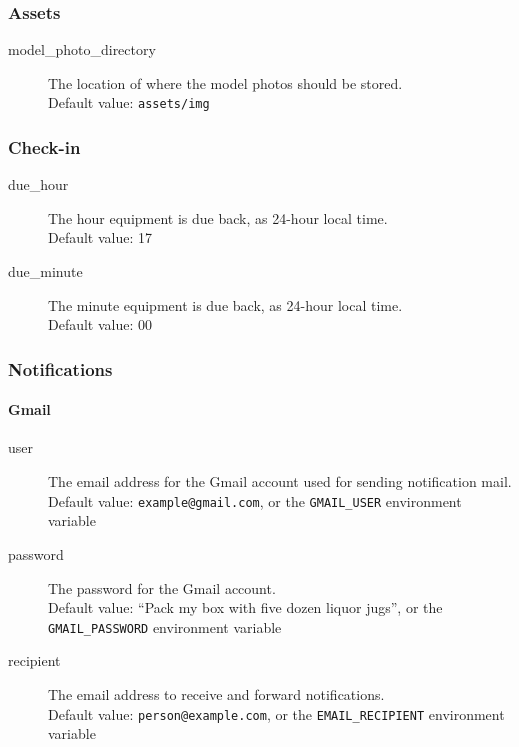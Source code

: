 \subsubsection{Assets}
\label{subsubsec:server_config_assets}

\begin{description}
  \item[model\_photo\_directory] The location of where the model photos should be stored.\\
    Default value: \texttt{assets/img}
\end{description}

\subsubsection{Check-in}
\label{subsubsec:server_config_checkin}

\begin{description}
  \item[due\_hour] The hour equipment is due back, as 24-hour local time.\\
    Default value: 17
  \item[due\_minute] The minute equipment is due back, as 24-hour local time.\\
    Default value: 00
\end{description}

\subsubsection{Notifications}
\label{subsubsec:server_config_notifications}

\paragraph{Gmail}
\label{par:gmail_notifications}

\begin{description}
  \item[user] The email address for the Gmail account used for sending notification mail.\\
    Default value: \texttt{example@gmail.com}, or the \texttt{GMAIL\_USER} environment variable
  \item[password] The password for the Gmail account.\\
    Default value: ``Pack my box with five dozen liquor jugs'', or the \texttt{GMAIL\_PASSWORD} environment variable
  \item[recipient] The email address to receive and forward notifications.\\
    Default value: \texttt{person@example.com}, or the \texttt{EMAIL\_RECIPIENT} environment variable
\end{description}

